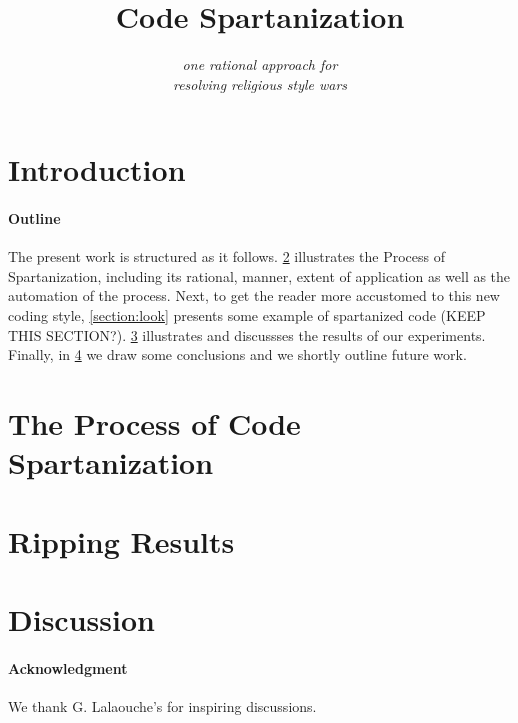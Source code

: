 \documentclass[preprint,10pt,nonatbib]{sigplanconf}
\title{Code Spartanization}
\subtitle{\scriptsize \emph{one rational approach for\\ resolving religious style wars}}
\begin{document}
\maketitle

\def\ignore#1{}
\def\gal{\marginpar[G$\Rightarrow$]{$\Leftarrow$G}}
\def\yossi{\marginpar[Y$\Rightarrow$]{$\Leftarrow$Y}}
\def\matteo{\marginpar[M$\Rightarrow$]{$\Leftarrow$M}}

\begin{abstract}
  
\end{abstract}

\section{Introduction}


\paragraph{Outline}
The present work is structured as it follows.
\cref{section:principia} illustrates the Process of Spartanization, 
including its rational, manner, extent of application as well as
the automation of the process. 
Next, to get the reader more accustomed to this new coding style, 
\cref{section:look} presents some example of spartanized code (KEEP THIS SECTION?).
\cref{section:initial} illustrates and discussses 
the results of our experiments.
Finally, in \cref{section:zz} we draw some conclusions and we shortly
outline future work.

\section{The Process of Code Spartanization}
\label{section:principia}


\section{Ripping Results}
\label{section:initial}


\section{Discussion}
\label{section:zz}


\paragraph{Acknowledgment}
We thank G. Lalaouche's for inspiring discussions.
\end{document}
